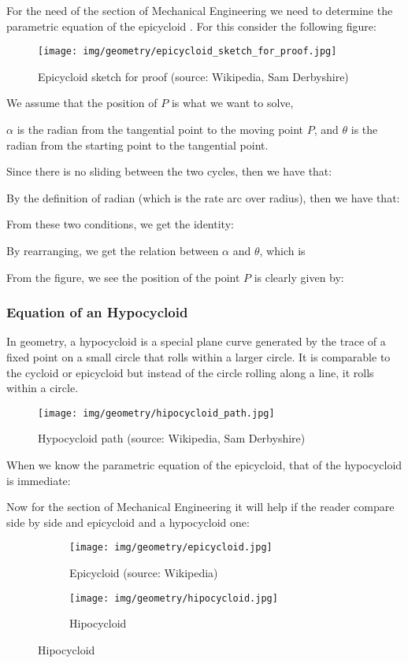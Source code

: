 	For the need of the section of Mechanical Engineering we need to determine the parametric equation of the epicycloid . For this consider the following figure:
	\begin{figure}[H]
		\centering
		\texttt{[image: img/geometry/epicycloid\_sketch\_for\_proof.jpg]}
		\caption[Epicycloid sketch for proof]{Epicycloid sketch for proof (source: Wikipedia, Sam Derbyshire)}
	\end{figure}
	We assume that the position of $P$ is what we want to solve, {$\alpha$  is the radian from the tangential point to the moving point $P$, and $\theta$  is the radian from the starting point to the tangential point.

	Since there is no sliding between the two cycles, then we have that:
	
	By the definition of radian (which is the rate arc over radius), then we have that:
		
	From these two conditions, we get the identity:
	
	By rearranging, we get the relation between $\alpha$  and $\theta$, which is
	
	From the figure, we see the position of the point $P$ is clearly given by:
	
	
	\subsubsection{Equation of an Hypocycloid}
	In geometry, a hypocycloid is a special plane curve generated by the trace of a fixed point on a small circle that rolls within a larger circle. It is comparable to the cycloid or epicycloid but instead of the circle rolling along a line, it rolls within a circle.
	\begin{figure}[H]
		\centering
		\texttt{[image: img/geometry/hipocycloid\_path.jpg]}
		\caption[Hypocycloid path]{Hypocycloid path (source: Wikipedia, Sam Derbyshire)}
	\end{figure}
	When we know the parametric equation of the epicycloid, that of the hypocycloid is immediate:
	
	Now for the section of Mechanical Engineering it will help if the reader compare side by side and epicycloid and a hypocycloid one:
	\begin{figure}[H]
		\centering
		\begin{subfigure}{.4\textwidth}
		  \centering
		  \texttt{[image: img/geometry/epicycloid.jpg]}
		  \caption[Epicycloid]{Epicycloid (source: Wikipedia)}
		\end{subfigure}
		\begin{subfigure}{.4\textwidth}
		  \centering
		  \texttt{[image: img/geometry/hipocycloid.jpg]}
		  \caption{Hipocycloid}
		\end{subfigure}
	\end{figure}
		
}
